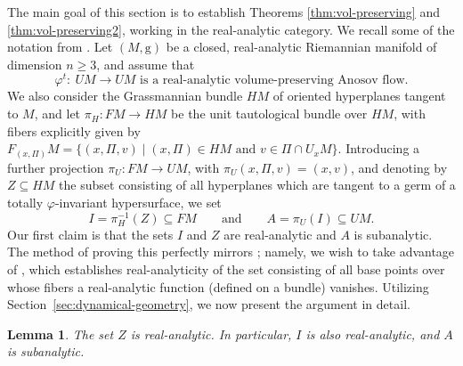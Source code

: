 \documentclass[pdftex]{sigma}
\newcommand{\g}{\mathrm{g}}
\numberwithin{equation}{section}
\newtheorem{Lemma}[Theorem]{Lemma}
\theoremstyle{definition}
\begin{document}
The main goal of this section is to establish Theorems \ref{thm:vol-preserving} and \ref{thm:vol-preserving2}, working in the real-analytic category. We recall some of the notation from \cite{filip2024finiteness}. Let $(M,\g)$ be a closed, real-analytic Riemannian manifold of dimension $n\geq 3$, and assume that \begin{equation}\label{phi-assumptions}
 \text{$\varphi^t \colon \ UM \rightarrow UM$ is a real-analytic volume-preserving Anosov flow.}
\end{equation}
We also consider the Grassmannian bundle $HM$ of oriented hyperplanes tangent to $M$, and let \mbox{$\pi_H \colon FM \rightarrow HM$} be the unit tautological bundle over $HM$, with fibers explicitly given by $F_{(x, \Pi)}M = \{(x,\Pi,v) \mid (x,\Pi) \in HM \mbox{ and } v \in \Pi \cap U_xM\}$. Introducing a further projection $\pi_U \colon FM \rightarrow UM$, with $\pi_U(x,\Pi,v)=(x,v)$,
and denoting by $Z \subseteq HM$ the subset consisting of all hyperplanes which are tangent to a germ of a totally $\varphi$-invariant hypersurface, we set
\begin{equation}\label{I-and-A} I =\pi_H^{-1}(Z) \subseteq FM \qquad\mbox{and}\qquad A = \pi_U(I)\subseteq UM. \end{equation}
Our first claim is that the sets $I$ and $Z$ are real-analytic and $A$ is subanalytic. The method of proving this perfectly mirrors \cite[Corollary 3.2.3]{filip2024finiteness}; namely, we wish to take advantage of \cite[Lemma~3.2.2]{filip2024finiteness}, which establishes real-analyticity of the set consisting of all base points over whose fibers a real-analytic function (defined on a bundle) vanishes. Utilizing Section~\ref{sec:dynamical-geometry},
we now present the argument in detail.

\begin{Lemma}
 The set $Z$ is real-analytic. In particular, $I$ is also real-analytic, and $A$ is subanalytic.
\end{Lemma}
\end{document}
